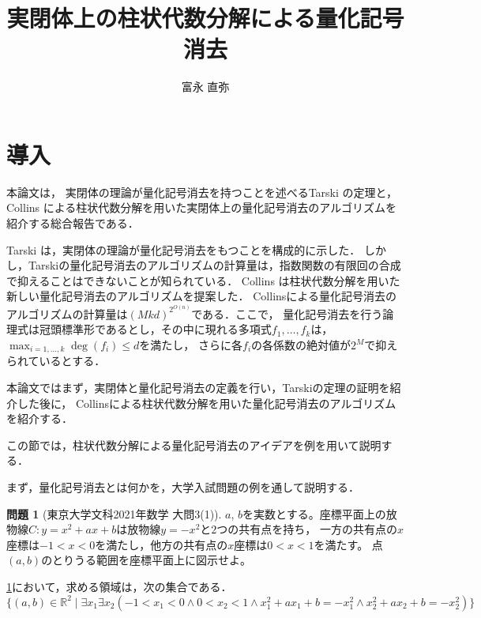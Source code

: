 \documentclass[uplatex, dvipdfmx]{jsarticle}
\numberwithin{equation}{section}
\newcommand{\R}{\mathbb{R}}
\theoremstyle{definition}
\newtheorem{question}[definition]{問題}
\begin{document}
\title{実閉体上の柱状代数分解による量化記号消去}
\author{富永 直弥}
\maketitle

\tableofcontents

\section{導入}\label{section:1}
     本論文は，     
     実閉体の理論が量化記号消去を持つことを述べるTarski \cite{MR0044472}の定理と，
     Collins \cite{MR0403962}による柱状代数分解を用いた実閉体上の量化記号消去のアルゴリズムを紹介する総合報告である．

     Tarski \cite{MR0044472}は，実閉体の理論が量化記号消去をもつことを構成的に示した．
     しかし，Tarskiの量化記号消去のアルゴリズムの計算量は，指数関数の有限回の合成で抑えることはできないことが知られている．
     Collins \cite{MR0403962}は柱状代数分解を用いた新しい量化記号消去のアルゴリズムを提案した．
     Collinsによる量化記号消去のアルゴリズムの計算量は$(Mkd)^{2^{O(n)}}$である\cite{MR0949113}．ここで，
     量化記号消去を行う論理式は冠頭標準形であるとし，その中に現れる多項式$f_1, \dots, f_k$は，$\max_{i=1,\dots, k}\deg(f_i) \leq d$を満たし，
     さらに各$f_i$の各係数の絶対値が$2^M$で抑えられているとする．

     本論文ではまず，実閉体と量化記号消去の定義を行い，Tarskiの定理の証明を紹介した後に，
     Collinsによる柱状代数分解を用いた量化記号消去のアルゴリズムを紹介する．

     この節では，柱状代数分解による量化記号消去のアイデアを例を用いて説明する．

     まず，量化記号消去とは何かを，大学入試問題の例を通して説明する．

     \begin{question}[東京大学文科2021年数学 大問3(1)]\label{question:ut2021}
          $a$, $b$を実数とする。座標平面上の放物線$C:y=x^2+ax+b$は放物線$y=-x^2$と$2$つの共有点を持ち，
          一方の共有点の$x$座標は$-1<x<0$を満たし，他方の共有点の$x$座標は$0<x<1$を満たす。
          点$(a,b)$のとりうる範囲を座標平面上に図示せよ。
     \end{question}

     \cref{question:ut2021}において，求める領域は，次の集合である．
     \begin{equation}
          \{(a,b) \in \R^2 \mid \exists x_1 \exists x_2(-1 < x_1 < 0 \land 0 < x_2 < 1 \land x_1^2+ax_1+b = -x_1^2 \land x_2^2 + ax_2 + b = -x_2^2) \}
     \end{equation}
\end{document}
